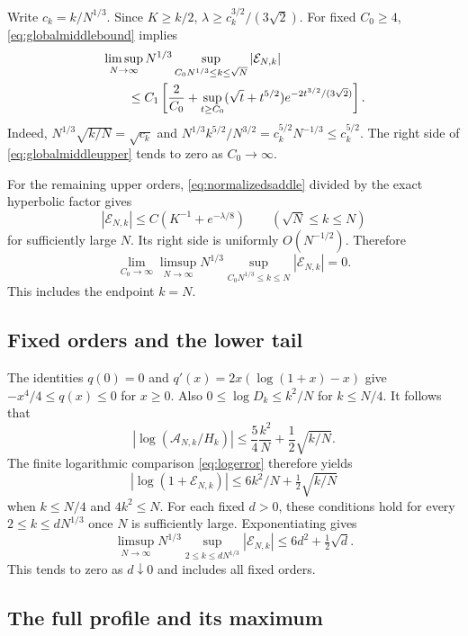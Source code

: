 Write $c_k=k/N^{1/3}$. Since $K\ge k/2$,
$\lambda\ge c_k^{3/2}/(3\sqrt2)$. For fixed $C_0\ge4$, \eqref{eq:globalmiddlebound} implies
\begin{align}
&\limsup_{N\to\infty}N^{1/3}
\sup_{C_0N^{1/3}\le k\le\sqrt N}|\mathcal E_{N,k}|\notag\\
&\qquad\le C_1\left[
\frac2{C_0}+\sup_{t\ge C_0}(\sqrt t+t^{5/2})
e^{-2t^{3/2}/(3\sqrt2)}\right].\label{eq:globalmiddleupper}
\end{align}
Indeed, $N^{1/3}\sqrt{k/N}=\sqrt{c_k}$ and
$N^{1/3}k^{5/2}/N^{3/2}=c_k^{5/2}N^{-1/3}\le c_k^{5/2}$. The right side of \eqref{eq:globalmiddleupper} tends to zero as $C_0\to\infty$.

For the remaining upper orders, \eqref{eq:normalizedsaddle} divided by the exact hyperbolic factor gives
\[
|\mathcal E_{N,k}|\le C(K^{-1}+e^{-\lambda/8})
\qquad(\sqrt N\le k\le N)
\]
for sufficiently large $N$. Its right side is uniformly $O(N^{-1/2})$. Therefore
\begin{equation}\label{eq:globaltailinfty}
\lim_{C_0\to\infty}\limsup_{N\to\infty}
N^{1/3}\sup_{C_0N^{1/3}\le k\le N}|\mathcal E_{N,k}|=0.
\end{equation}
This includes the endpoint $k=N$.

\subsection{Fixed orders and the lower tail}

The identities $q(0)=0$ and $q'(x)=2x(\log(1+x)-x)$ give
$-x^4/4\le q(x)\le0$ for $x\ge0$. Also
$0\le\log D_k\le k^2/N$ for $k\le N/4$. It follows that
\[
\left|\log(\mathcal A_{N,k}/H_k)\right|
\le\frac54\frac{k^2}N+\frac12\sqrt{k/N}.
\]
The finite logarithmic comparison \eqref{eq:logerror} therefore yields
\[
\left|\log(1+\mathcal E_{N,k})\right|
\le6k^2/N+\tfrac12\sqrt{k/N}
\]
when $k\le N/4$ and $4k^2\le N$. For each fixed $d>0$, these conditions hold for every $2\le k\le dN^{1/3}$ once $N$ is sufficiently large. Exponentiating gives
\begin{equation}\label{eq:globaltailzero}
\limsup_{N\to\infty}N^{1/3}
\sup_{2\le k\le dN^{1/3}}|\mathcal E_{N,k}|
\le6d^2+\tfrac12\sqrt d.
\end{equation}
This tends to zero as $d\downarrow0$ and includes all fixed orders.

\subsection{The full profile and its maximum}

